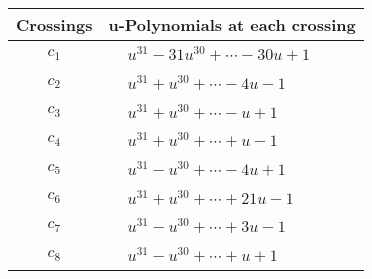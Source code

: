 \documentclass[1p]{elsarticle_modified}
\theoremstyle{definition}
\begin{document}
\begin{tabular}{m{50pt}|m{274pt}}
Crossings & \hspace{64pt}u-Polynomials at each crossing \\
\hline $$\begin{aligned}c_{1}\end{aligned}$$&$\begin{aligned}
&u^{31}-31 u^{30}+\cdots-30 u+1
\end{aligned}$\\
\hline $$\begin{aligned}c_{2}\end{aligned}$$&$\begin{aligned}
&u^{31}+u^{30}+\cdots-4 u-1
\end{aligned}$\\
\hline $$\begin{aligned}c_{3}\end{aligned}$$&$\begin{aligned}
&u^{31}+u^{30}+\cdots- u+1
\end{aligned}$\\
\hline $$\begin{aligned}c_{4}\end{aligned}$$&$\begin{aligned}
&u^{31}+u^{30}+\cdots+u-1
\end{aligned}$\\
\hline $$\begin{aligned}c_{5}\end{aligned}$$&$\begin{aligned}
&u^{31}- u^{30}+\cdots-4 u+1
\end{aligned}$\\
\hline $$\begin{aligned}c_{6}\end{aligned}$$&$\begin{aligned}
&u^{31}+u^{30}+\cdots+21 u-1
\end{aligned}$\\
\hline $$\begin{aligned}c_{7}\end{aligned}$$&$\begin{aligned}
&u^{31}- u^{30}+\cdots+3 u-1
\end{aligned}$\\
\hline $$\begin{aligned}c_{8}\end{aligned}$$&$\begin{aligned}
&u^{31}- u^{30}+\cdots+u+1
\end{aligned}$\\

\end{tabular}
\end{document}
